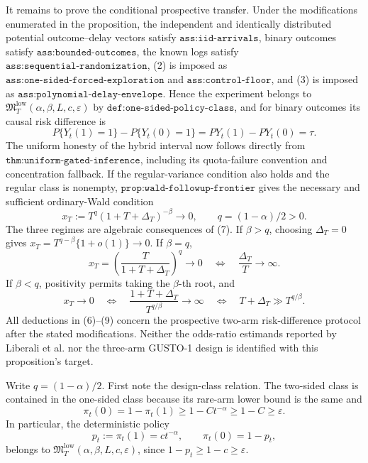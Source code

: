 It remains to prove the conditional prospective transfer.  Under the modifications enumerated in the proposition, the independent and identically distributed potential outcome--delay vectors satisfy \(\texttt{ass:iid-arrivals}\), binary outcomes satisfy \(\texttt{ass:bounded-outcomes}\), the known logs satisfy \(\texttt{ass:sequential-randomization}\), (2) is imposed as \(\texttt{ass:one-sided-forced-exploration}\) and \(\texttt{ass:control-floor}\), and (3) is imposed as \(\texttt{ass:polynomial-delay-envelope}\).  Hence the experiment belongs to \(\mathfrak M_T^{\mathrm{low}}(\alpha,\beta,L,c,\varepsilon)\) by \(\texttt{def:one-sided-policy-class}\), and for binary outcomes its causal risk difference is
\[
 P\{Y_t(1)=1\}-P\{Y_t(0)=1\}
 =P Y_t(1)-P Y_t(0)=\tau.
 \tag{6}
\]
The uniform honesty of the hybrid interval now follows directly from \(\texttt{thm:uniform-gated-inference}\), including its quota-failure convention and concentration fallback.  If the regular-variance condition also holds and the regular class is nonempty, \(\texttt{prop:wald-followup-frontier}\) gives the necessary and sufficient ordinary-Wald condition
\[
 x_T:=T^q(1+T+\Delta_T)^{-\beta}\longrightarrow0,
 \qquad q=(1-\alpha)/2>0.
 \tag{7}
\]
The three regimes are algebraic consequences of (7).  If \(\beta>q\), choosing \(\Delta_T=0\) gives \(x_T=T^{q-\beta}\{1+o(1)\}\to0\).  If \(\beta=q\),
\[
 x_T=\left(\frac{T}{1+T+\Delta_T}\right)^q\to0
 \quad\Longleftrightarrow\quad
 \frac{\Delta_T}{T}\to\infty.
 \tag{8}
\]
If \(\beta<q\), positivity permits taking the \(\beta\)-th root, and
\[
 x_T\to0
 \quad\Longleftrightarrow\quad
 \frac{1+T+\Delta_T}{T^{q/\beta}}\to\infty
 \quad\Longleftrightarrow\quad
 T+\Delta_T\gg T^{q/\beta}.
 \tag{9}
\]
All deductions in (6)--(9) concern the prospective two-arm risk-difference protocol after the stated modifications.  Neither the odds-ratio estimands reported by Liberali et al. nor the three-arm GUSTO-1 design is identified with this proposition's target.

Write \(q=(1-\alpha)/2\).  First note the design-class relation.  The two-sided class is contained in the one-sided class because its rare-arm lower bound is the same and
\[
 \pi_t(0)=1-\pi_t(1)\geq1-Ct^{-\alpha}\geq1-C\geq\varepsilon.
 \tag{1}
\]
In particular, the deterministic policy
\[
 p_t:=\pi_t(1)=ct^{-\alpha},
 \qquad \pi_t(0)=1-p_t,
 \tag{2}
\]
belongs to \(\mathfrak M_T^{\mathrm{low}}(\alpha,\beta,L,c,\varepsilon)\), since \(1-p_t\geq1-c\geq\varepsilon\).

